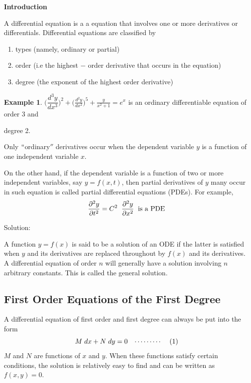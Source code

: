 \documentclass[11pt,a4paper]{article}
\theoremstyle{definition}
\newtheorem{exa}[thm]{Example}
\newcommand{\subhead}[1]{%
  \par\medskip\noindent\textbf{#1}\par\nobreak\smallskip}
\begin{document}
\subhead{Introduction}


A differential equation is a a equation that involves one or more derivatives or differentials. Differential equations are classified by
\begin{enumerate}
\item types (namely, ordinary or partial)
\item order (i.e the highest $-$ order derivative that occurs in the equation)
\item degree (the exponent of the highest order derivative)
\end{enumerate}

\begin{exa}


$\displaystyle{\Bigg(\dfrac{d^3y}{dx^3}\Bigg)^2 + \Bigg(\frac{d^2y}{dx^2}\Bigg)^5 + \frac{y}{x^2 + 1} = e^x}$\hspace{0.1cm}
is an ordinary differentiable equation of  order 3 and


degree 2.


Only $``$ordinary$''$ derivatives occur when the dependent variable $y$ is a function of one independent variable $x$.


On the other hand, if the dependent variable is a function of two or more independent variables, say $y=f(x,t)$, then partial derivatives of $y$ many occur in such equation is called partial differential equations (PDEs). For example, $$\frac{\partial^2y}{\partial t^2} = C^2\hspace{0.2cm} \frac{\partial^2y}{\partial x^2}\hspace{0.2cm}\text{is a PDE}$$

Solution:


A function $y = f(x)$ is said to be a solution of an ODE if the latter is satisfied when $y$ and its derivatives are replaced throughout by $f(x)$ and its derivatives. A differential equation of order $n$ will generally have a solution involving $n$ arbitrary constants. This is called the general solution.
\end{exa}


\subsection{First Order Equations of the First Degree}

A differential equation of first order and first degree can always be put into the form $$M\hspace{0.1cm} dx + N\hspace{0.1cm} dy = 0\hspace{0.3cm}\cdots\cdots\cdots\hspace{0.4cm} (1)$$
$M$ and $N$ are functions of $x$ and $y$. When these functions satisfy certain conditions, the solution is relatively easy to find and can be written as $f(x,y) = 0$.
\end{document}
